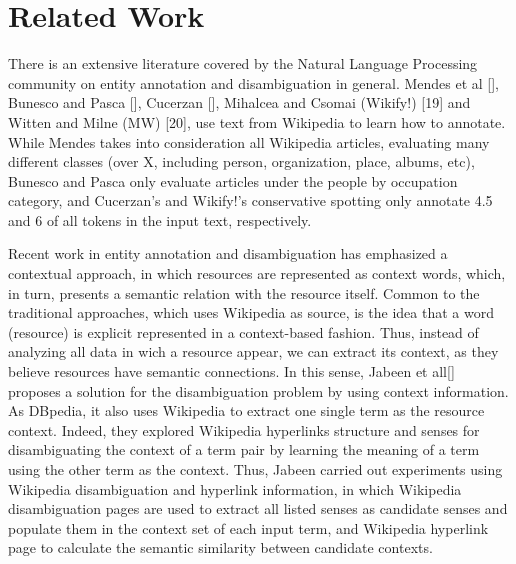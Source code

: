 \documentclass[10pt,a4paper]{article}
\newcommand{\todo}[1]{{\color{red}\textsf{\textbf{TODO}}: #1}}
\begin{document}


\section{Related Work}


There is an extensive literature  covered by the Natural Language Processing community on entity annotation and disambiguation in general. Mendes et al [], Bunesco and Pasca [], Cucerzan [], Mihalcea and Csomai (Wikify!) [19] and Witten and Milne (MW) [20], use text from Wikipedia to learn how to annotate. While Mendes takes into consideration all Wikipedia articles, evaluating  many different classes (over X, including person, organization, place, albums, etc), Bunesco and Pasca only evaluate articles under the people by occupation category, and Cucerzan's and Wikify!'s conservative spotting only annotate 4.5 and 6 of all tokens in the input text, respectively. 

Recent work in entity annotation and disambiguation has emphasized a contextual approach, in which resources are represented as context words, which, in turn, presents a semantic relation with the resource itself. Common to the traditional approaches, which uses Wikipedia as source, is the idea that a word (resource) is explicit represented in a context-based fashion. Thus, instead of analyzing all data in wich a resource appear, we can extract its context, as they believe resources have semantic connections. In this sense, Jabeen et all[] proposes a solution for the disambiguation  problem by using context information. As DBpedia, it also uses Wikipedia  to extract one single term as the resource context. Indeed, they explored Wikipedia hyperlinks structure and senses for disambiguating the context of a term pair by learning the meaning of a term using the other term as the context.  Thus, Jabeen carried out experiments  using Wikipedia disambiguation and  hyperlink information, in which Wikipedia disambiguation pages  are used to extract all listed senses as candidate senses and populate them in the context set of each input term, and Wikipedia hyperlink page to calculate the semantic similarity between candidate contexts.
\end{document}
